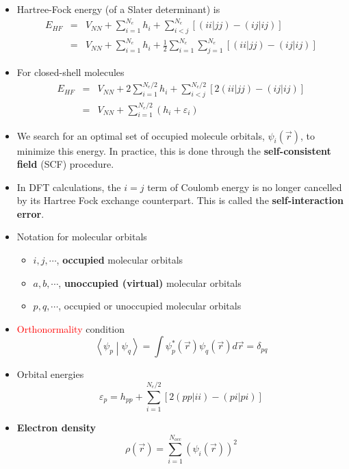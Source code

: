 \documentclass[handout]{beamer} %
\begin{document}
\begin{frame}
\begin{itemize}  \itemsep 2mm
\item \footnotesize{Hartree-Fock energy (of a Slater determinant) is }
\begin{eqnarray*}
E_{HF} & = & V_{NN} + \sum_{i=1}^{N_e} h_i + \sum_{i<j}^{N_e} \left[ (ii|jj) - (ij|ij) \right]   \\
& = & V_{NN} + \sum_{i=1}^{N_e} h_i + \frac{1}{2} \sum_{i=1}^{N_e} \sum_{j=1}^{N_e} \left[ (ii|jj) - (ij|ij) \right]   
\end{eqnarray*}
\item For closed-shell molecules
\begin{eqnarray*}
E_{HF} & = & V_{NN} + 2 \sum_{i=1}^{N_e/2} h_i + \sum_{i<j}^{N_e/2} \left[ 2 (ii|jj) - (ij|ij) \right]     \\
& = & V_{NN}  +  \sum_{i=1}^{N_e/2} \left( h_i + \varepsilon_i \right)
\end{eqnarray*}
\item We search for an optimal set of occupied molecule orbitals, $\psi_i(\vec{r})$, to minimize this energy.   In practice, this is done through the \textbf{self-consistent field} (SCF) procedure. 
\item In DFT calculations, the $i=j$ term of Coulomb energy is no longer cancelled by its Hartree Fock exchange counterpart.   This is called the \textbf{self-interaction error}.   
\end{itemize}
\end{frame}

\begin{frame}
\begin{itemize} \itemsep 5mm
\item Notation for molecular orbitals
\begin{itemize}
\item $i, j, \cdots$,   \textbf{occupied} molecular orbitals
\item $a, b, \cdots$,   \textbf{unoccupied (virtual)} molecular orbitals
\item $p, q, \cdots$, occupied or unoccupied molecular orbitals
\end{itemize}
\item \textcolor{red}{Orthonormality} condition
\begin{equation*}
\left< \psi_p \middle|  \psi_q \right>  = \int \psi_p^*(\vec{r})   \psi_q(\vec{r})  d\vec{r} = \delta_{pq} 
\end{equation*}
\item Orbital energies
\begin{equation*}
\varepsilon_p = h_{pp} + \sum_{i=1}^{N_e/2} \left[ 2 (pp|ii) - (pi | pi) \right]  
\end{equation*}
\item \textbf{Electron density}
\begin{equation*}
\rho(\vec{r}) =  \sum_{i=1}^{N_{occ}} (\psi_i(\vec{r})) ^2  
\end{equation*}
\end{itemize}
\end{frame}
\end{document}
